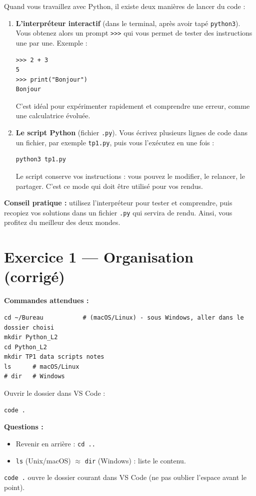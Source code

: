\documentclass[11pt,a4paper]{article}
\begin{document}
\newpage
\begin{tcolorbox}[title=Interpréteur vs Script Python]
Quand vous travaillez avec Python, il existe deux manières de lancer du code :

\begin{enumerate}
  \item \textbf{L’interpréteur interactif} (dans le terminal, après avoir tapé \texttt{python3}).  
  Vous obtenez alors un prompt \texttt{>>>} qui vous permet de tester des instructions une par une.  
  Exemple :  
\begin{lstlisting}
>>> 2 + 3
5
>>> print("Bonjour")
Bonjour
\end{lstlisting}  
C’est idéal pour expérimenter rapidement et comprendre une erreur, comme une calculatrice évoluée.

  \item \textbf{Le script Python} (fichier \texttt{.py}).  
  Vous écrivez plusieurs lignes de code dans un fichier, par exemple \texttt{tp1.py}, puis vous l’exécutez en une fois :  
\begin{lstlisting}[language=terminal]
python3 tp1.py
\end{lstlisting}  
Le script conserve vos instructions : vous pouvez le modifier, le relancer, le partager. C’est ce mode qui doit être utilisé pour vos rendus.

\end{enumerate}

\textbf{Conseil pratique :} utilisez l’interpréteur pour tester et comprendre, puis recopiez vos solutions dans un fichier \texttt{.py} qui servira de rendu. Ainsi, vous profitez du meilleur des deux mondes.
\end{tcolorbox}

\section*{Exercice 1 — Organisation (corrigé)}
\textbf{Commandes attendues :}
\begin{lstlisting}[language=terminal]
cd ~/Bureau           # (macOS/Linux) - sous Windows, aller dans le dossier choisi
mkdir Python_L2
cd Python_L2
mkdir TP1 data scripts notes
ls      # macOS/Linux
# dir   # Windows
\end{lstlisting}
Ouvrir le dossier dans VS Code :
\begin{lstlisting}[language=terminal]
code .
\end{lstlisting}
\textbf{Questions :}
\begin{itemize}
  \item Revenir en arrière : \texttt{cd ..}
  \item \texttt{ls} (Unix/macOS) $\approx$ \texttt{dir} (Windows) : liste le contenu.
\end{itemize}
\begin{AstuceBox}
\texttt{code .} ouvre le dossier courant dans VS Code (ne pas oublier l’espace avant le point).
\end{AstuceBox}
\end{document}
